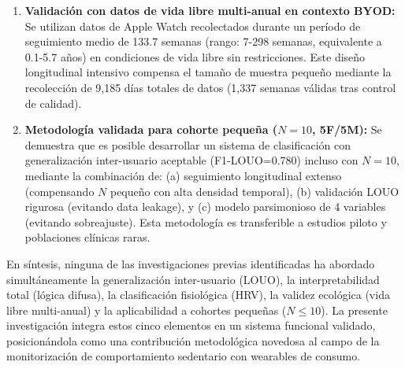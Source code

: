 \begin{enumerate}
    \item \textbf{Validación con datos de vida libre multi-anual en contexto BYOD:} Se utilizan datos de Apple Watch recolectados durante un período de seguimiento medio de 133.7 semanas (rango: 7-298 semanas, equivalente a 0.1-5.7 años) en condiciones de vida libre sin restricciones. Este diseño longitudinal intensivo \cite{Bolger2013} compensa el tamaño de muestra pequeño mediante la recolección de 9,185 días totales de datos (1,337 semanas válidas tras control de calidad).
    
    \item \textbf{Metodología validada para cohorte pequeña ($N=10$, 5F/5M):} Se demuestra que es posible desarrollar un sistema de clasificación con generalización inter-usuario aceptable (F1-LOUO=0.780) incluso con $N=10$, mediante la combinación de: (a) seguimiento longitudinal extenso (compensando $N$ pequeño con alta densidad temporal), (b) validación LOUO rigurosa (evitando data leakage), y (c) modelo parsimonioso de 4 variables (evitando sobreajuste). Esta metodología es transferible a estudios piloto y poblaciones clínicas raras.
\end{enumerate}

En síntesis, ninguna de las investigaciones previas identificadas ha abordado simultáneamente la generalización inter-usuario (LOUO), la interpretabilidad total (lógica difusa), la clasificación fisiológica (HRV), la validez ecológica (vida libre multi-anual) y la aplicabilidad a cohortes pequeñas ($N \leq 10$). La presente investigación integra estos cinco elementos en un sistema funcional validado, posicionándola como una contribución metodológica novedosa al campo de la monitorización de comportamiento sedentario con wearables de consumo.


